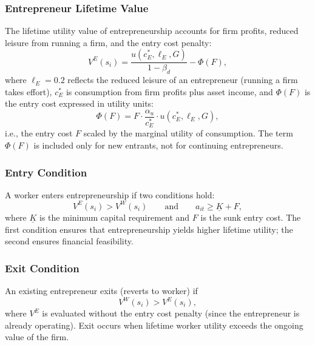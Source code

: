 \documentclass[12pt]{article}
\begin{document}
\subsubsection{Entrepreneur Lifetime Value}

The lifetime utility value of entrepreneurship accounts for firm profits, reduced leisure from running a firm, and the entry cost penalty:
\begin{equation}\label{eq:entre_value}
  V^E(s_i) = \frac{u(c^*_E, \ell_E, G)}{1 - \beta_d} - \Phi(F),
\end{equation}
where $\ell_E = 0.2$ reflects the reduced leisure of an entrepreneur (running a firm takes effort), $c^*_E$ is consumption from firm profits plus asset income, and $\Phi(F)$ is the entry cost expressed in utility units:
\begin{equation}\label{eq:entry_cost_utility}
  \Phi(F) = F \cdot \frac{\alpha_u}{c^*_E} \cdot u(c^*_E, \ell_E, G),
\end{equation}
i.e., the entry cost $F$ scaled by the marginal utility of consumption. The term $\Phi(F)$ is included only for new entrants, not for continuing entrepreneurs.

\subsubsection{Entry Condition}

A worker enters entrepreneurship if two conditions hold:
\begin{equation}\label{eq:entry}
  V^E(s_i) > V^W(s_i) \qquad \text{and} \qquad a_{it} \geq \underline{K} + F,
\end{equation}
where $\underline{K}$ is the minimum capital requirement and $F$ is the sunk entry cost. The first condition ensures that entrepreneurship yields higher lifetime utility; the second ensures financial feasibility.

\subsubsection{Exit Condition}

An existing entrepreneur exits (reverts to worker) if
\begin{equation}\label{eq:exit}
  V^W(s_i) > V^E(s_i),
\end{equation}
where $V^E$ is evaluated without the entry cost penalty (since the entrepreneur is already operating). Exit occurs when lifetime worker utility exceeds the ongoing value of the firm.
\end{document}
